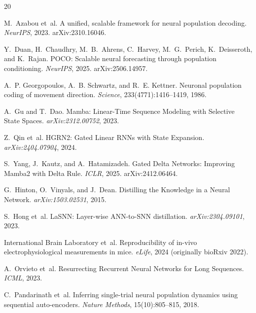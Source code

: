 \documentclass{article}
\begin{document}
{\small

\begin{thebibliography}{20}

M.~Azabou et~al.
\newblock A unified, scalable framework for neural population decoding.
\newblock \emph{NeurIPS}, 2023.  arXiv:2310.16046.

Y.~Duan, H.~Chaudhry, M.~B.~Ahrens, C.~Harvey, M.~G.~Perich,
  K.~Deisseroth, and K.~Rajan.
\newblock POCO: Scalable neural forecasting through population
  conditioning.
\newblock \emph{NeurIPS}, 2025.  arXiv:2506.14957.

A.~P. Georgopoulos, A.~B. Schwartz, and R.~E. Kettner.
\newblock Neuronal population coding of movement direction.
\newblock \emph{Science}, 233(4771):1416--1419, 1986.

A.~Gu and T.~Dao.
\newblock Mamba: Linear-Time Sequence Modeling with Selective State Spaces.
\newblock \emph{arXiv:2312.00752}, 2023.

Z.~Qin et~al.
\newblock HGRN2: Gated Linear RNNs with State Expansion.
\newblock \emph{arXiv:2404.07904}, 2024.

S.~Yang, J.~Kautz, and A.~Hatamizadeh.
\newblock Gated Delta Networks: Improving Mamba2 with Delta Rule.
\newblock \emph{ICLR}, 2025.  arXiv:2412.06464.

G.~Hinton, O.~Vinyals, and J.~Dean.
\newblock Distilling the Knowledge in a Neural Network.
\newblock \emph{arXiv:1503.02531}, 2015.

S.~Hong et~al.
\newblock LaSNN: Layer-wise ANN-to-SNN distillation.
\newblock \emph{arXiv:2304.09101}, 2023.

International Brain Laboratory et~al.
\newblock Reproducibility of in-vivo electrophysiological measurements
  in mice.
\newblock \emph{eLife}, 2024 (originally bioRxiv 2022).

A.~Orvieto et~al.
\newblock Resurrecting Recurrent Neural Networks for Long Sequences.
\newblock \emph{ICML}, 2023.

C.~Pandarinath et~al.
\newblock Inferring single-trial neural population dynamics using
  sequential auto-encoders.
\newblock \emph{Nature Methods}, 15(10):805--815, 2018.


\end{thebibliography}}
\end{document}
